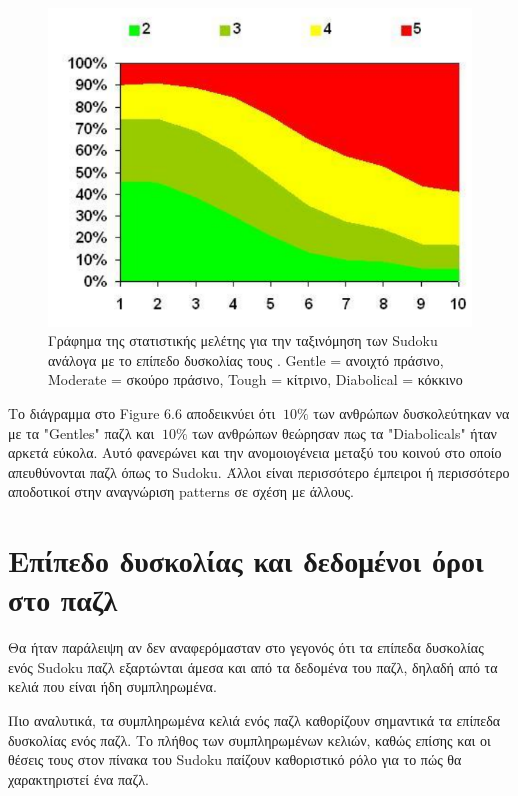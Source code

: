 \documentclass[oneside,12pt]{book}
\theoremstyle{definition}
\begin{document}
\begin{figure}[h]
	\centering
	\includegraphics[scale=0.55]{Figures/stat3.png}
	\caption{Γράφημα της στατιστικής μελέτης για την ταξινόμηση των Sudoku ανάλογα με το επίπεδο δυσκολίας τους . Gentle = ανοιχτό πράσινο, Moderate = σκούρο πράσινο, Tough = κίτρινο, Diabolical = κόκκινο}
\end{figure}

Το διάγραμμα στο Figure 6.6 αποδεικνύει ότι \(~10\%\) των ανθρώπων δυσκολεύτηκαν να με τα "Gentles" παζλ και \(~10\%\) των ανθρώπων θεώρησαν πως τα "Diabolicals" ήταν αρκετά εύκολα. Αυτό φανερώνει και την ανομοιογένεια μεταξύ του κοινού στο οποίο απευθύνονται παζλ όπως το Sudoku. Άλλοι είναι περισσότερο έμπειροι ή περισσότερο αποδοτικοί στην αναγνώριση patterns σε σχέση με άλλους.

\section{Επίπεδο δυσκολίας και δεδομένοι όροι στο παζλ}

Θα ήταν παράλειψη αν δεν αναφερόμασταν στο γεγονός ότι τα επίπεδα δυσκολίας ενός Sudoku παζλ εξαρτώνται άμεσα και από τα δεδομένα του παζλ, δηλαδή από τα κελιά που είναι ήδη συμπληρωμένα. \par

Πιο αναλυτικά, τα συμπληρωμένα κελιά ενός παζλ καθορίζουν σημαντικά τα επίπεδα δυσκολίας ενός παζλ. Το πλήθος των συμπληρωμένων κελιών, καθώς επίσης και οι θέσεις τους στον πίνακα του Sudoku παίζουν καθοριστικό ρόλο για το πώς θα χαρακτηριστεί ένα παζλ. \par
\end{document}
